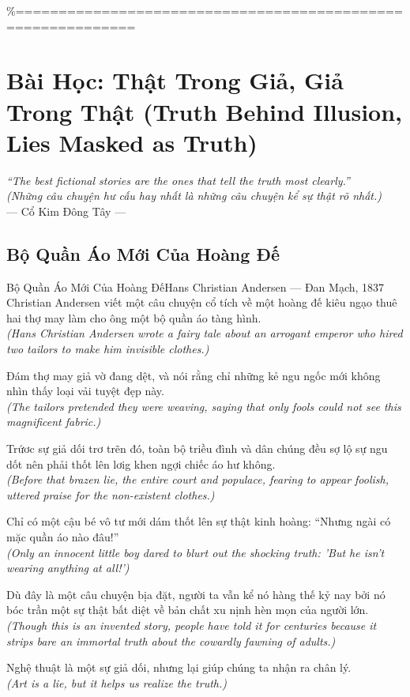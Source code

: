 \%============================================================
\chapter{Bài Học: Thật Trong Giả, Giả Trong Thật (Truth Behind Illusion, Lies Masked as Truth)}
\begin{center}
  \textit{\color{truyengold}``The best fictional stories are the ones that tell the truth most clearly.''}\\[4pt]
  \textit{(Những câu chuyện hư cấu hay nhất là những câu chuyện kể sự thật rõ nhất.)}\\[4pt]
  \small\color{truyenblue}--- Cổ Kim Đông Tây ---
\end{center}
\ngancach

\section{Bộ Quần Áo Mới Của Hoàng Đế}
\begin{truyen}{Bộ Quần Áo Mới Của Hoàng Đế}{Hans Christian Andersen --- Đan Mạch, 1837}
 Christian Andersen viết một câu chuyện cổ tích về một hoàng đế kiêu ngạo thuê hai thợ may làm cho ông một bộ quần áo tàng hình.\\[4pt]
\textit{(Hans Christian Andersen wrote a fairy tale about an arrogant emperor who hired two tailors to make him invisible clothes.)}

Đám thợ may giả vờ đang dệt, và nói rằng chỉ những kẻ ngu ngốc mới không nhìn thấy loại vải tuyệt đẹp này.\\[4pt]
\textit{(The tailors pretended they were weaving, saying that only fools could not see this magnificent fabric.)}

Trứơc sự giả dối trơ trẽn đó, toàn bộ triều đình và dân chúng đều sợ lộ sự ngu dốt nên phải thốt lên lơig khen ngợi chiếc áo hư không.\\[4pt]
\textit{(Before that brazen lie, the entire court and populace, fearing to appear foolish, uttered praise for the non-existent clothes.)}

Chỉ có một cậu bé vô tư mới dám thốt lên sự thật kinh hoàng: ``Nhưng ngài có mặc quần áo nào đâu!''\\[4pt]
\textit{(Only an innocent little boy dared to blurt out the shocking truth: 'But he isn't wearing anything at all!')}

Dù đây là một câu chuyện bịa đặt, người ta vẫn kể nó hàng thế kỷ nay bởi nó bóc trần một sự thật bất diệt về bản chất xu nịnh hèn mọn của người lớn.\\[4pt]
\textit{(Though this is an invented story, people have told it for centuries because it strips bare an immortal truth about the cowardly fawning of adults.)}

\end{truyen}
\begin{baihoc}
  Nghệ thuật là một sự giả dối, nhưng lại giúp chúng ta nhận ra chân lý.\\[4pt]
  \textit{(Art is a lie, but it helps us realize the truth.)}
\end{baihoc}

